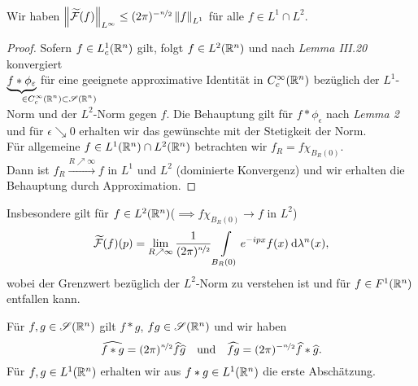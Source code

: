 \documentclass[skript.tex]{subfiles}
\begin{document}
	\begin{lem}
		Wir haben $\left\lVert \widetilde{\mathcal{F}}(f) \right\rVert_{L^\infty} \leq (2\pi)^{-\nicefrac{n}{2}} \left\lVert f \right\rVert_{L^1}$ für alle $f \in L^1 \cap L^2$.
	\end{lem}
	\begin{proof}
		Sofern $f \in L_c^1(\mathbb{R}^n)$ gilt, folgt $f \in L^2(\mathbb{R}^n)$ und nach \emph{Lemma III.20} konvergiert\\ $\underbrace{f \ast \phi_\epsilon}_{\mathrlap{\in C_c^\infty(\R^n)\sbs\ms{S}(\R^n)}}$ für eine geeignete approximative Identität in $C_c^\infty(\mathbb{R}^n)$ bezüglich der $L^1$-Norm und der $L^2$-Norm gegen $f$. Die Behauptung gilt für $f \ast \phi_\epsilon$ nach \emph{Lemma 2} und für $\epsilon \searrow 0$ erhalten wir das gewünschte mit der Stetigkeit der Norm.\\
		Für allgemeine $f \in L^1(\mathbb{R}^n) \cap L^2(\mathbb{R}^n)$ betrachten wir $f_R=f\chi_{B_R(0)}$.\\ %
		Dann ist $f_R\xrightarrow{R\nearrow\infty}f$ in $L^1$ und $L^2$ (dominierte Konvergenz) und wir erhalten die Behauptung durch Approximation.
	\end{proof}
	Insbesondere gilt für $f \in L^2(\mathbb{R}^n)$\quad($\implies  f\chi_{B_R(0)} \to f$ in $L^2$)
	\[
		\widetilde{\mathcal{F}}(f)(p) = \lim_{R\nearrow\infty} \frac{1}{(2\pi)^{\nicefrac{n}{2}}} \int\limits_{B_R(0)} e^{-ipx} f(x) \: \mathrm{d}\lambda^n(x),
	\]
	wobei der Grenzwert bezüglich der $L^2$-Norm zu verstehen ist und für $f \in F^1(\mathbb{R}^n)$ entfallen kann.
	\begin{lem}
		Für $f,g\in\mathscr{S}(\mathbb{R}^n)$ gilt $f \ast g$, $fg\in\mathscr{S}(\mathbb{R}^n)$ und wir haben
		\[
			\widehat{f \ast g} = (2\pi)^{\nicefrac{n}{2}} \widehat{f}\widehat{g} \quad\text{und}\quad \widehat{fg}=(2\pi)^{-\nicefrac{n}{2}}\widehat{f}\ast\widehat{g}.
		\]
		Für $f,g \in L^1(\mathbb{R}^n)$ erhalten wir aus $f \ast g \in L^1(\mathbb{R}^n)$ die erste Abschätzung.
	\end{lem}
\end{document}
